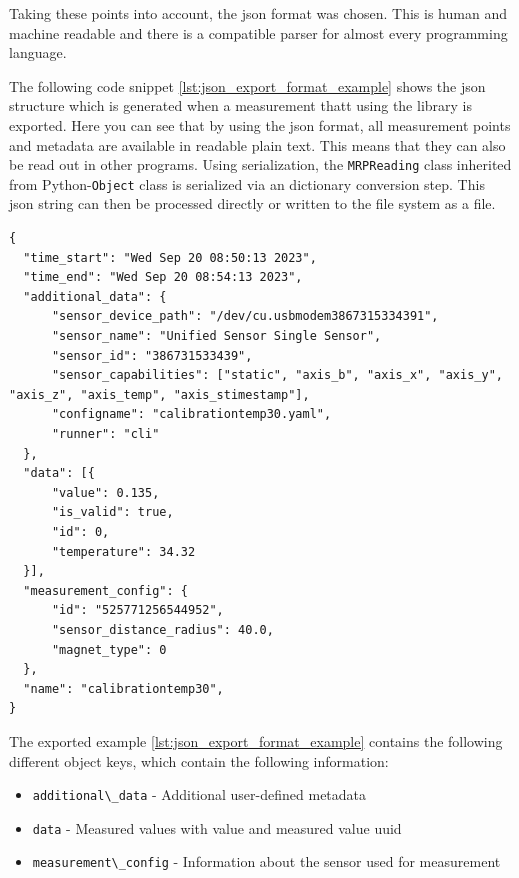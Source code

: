 Taking these points into account, the \gls{json} format was chosen. This
is human and machine readable and there is a compatible parser for
almost every programming language.

The following code snippet \ref{lst:json_export_format_example} shows
the \gls{json} structure which is generated when a measurement thatt
using the library is exported. Here you can see that by using the
\gls{json} format, all measurement points and metadata are available in
readable plain text. This means that they can also be read out in other
programs. Using serialization, the \passthrough{\lstinline!MRPReading!}
class inherited from Python-\passthrough{\lstinline!Object!} class is
serialized via an dictionary conversion step. This \gls{json} string can
then be processed directly or written to the file system as a file.

\begin{lstlisting}[caption={JSON export structure of an MRPReading based measurement}, label=lst:json_export_format_example]
{
  "time_start": "Wed Sep 20 08:50:13 2023",
  "time_end": "Wed Sep 20 08:54:13 2023",
  "additional_data": {
      "sensor_device_path": "/dev/cu.usbmodem3867315334391",
      "sensor_name": "Unified Sensor Single Sensor",
      "sensor_id": "386731533439",
      "sensor_capabilities": ["static", "axis_b", "axis_x", "axis_y", "axis_z", "axis_temp", "axis_stimestamp"],
      "configname": "calibrationtemp30.yaml",
      "runner": "cli"
  },
  "data": [{
      "value": 0.135,
      "is_valid": true,
      "id": 0,
      "temperature": 34.32
  }],
  "measurement_config": {
      "id": "525771256544952",
      "sensor_distance_radius": 40.0,
      "magnet_type": 0
  },
  "name": "calibrationtemp30",
}
\end{lstlisting}

The exported example \ref{lst:json_export_format_example} contains the
following different object keys, which contain the following
information:

\begin{itemize}
\tightlist
\item
  \passthrough{\lstinline!additional\_data!} - Additional user-defined
  metadata
\item
  \passthrough{\lstinline!data!} - Measured values with value and
  measured value \gls{uuid}
\item
  \passthrough{\lstinline!measurement\_config!} - Information about the
  sensor used for measurement
\end{itemize}

